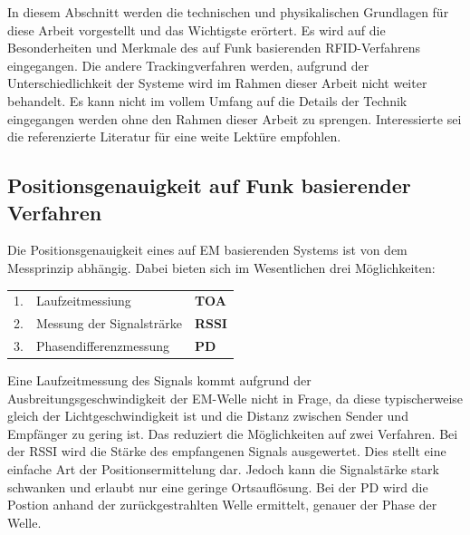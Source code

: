 In diesem Abschnitt werden die technischen und physikalischen Grundlagen für diese Arbeit vorgestellt und das Wichtigste erörtert. Es wird auf die Besonderheiten und Merkmale des auf Funk basierenden RFID-Verfahrens eingegangen. Die andere Trackingverfahren werden, aufgrund der Unterschiedlichkeit der Systeme wird im Rahmen dieser Arbeit nicht weiter behandelt. Es kann nicht im vollem Umfang auf die Details der Technik eingegangen werden ohne den Rahmen dieser Arbeit zu sprengen. Interessierte sei die referenzierte Literatur für eine weite Lektüre empfohlen.\\
%
%
\subsection{Positionsgenauigkeit auf Funk basierender Verfahren}
\label{sec:RFID_Accuracy}
Die Positionsgenauigkeit eines auf EM basierenden Systems ist von dem Messprinzip abhängig. Dabei bieten sich im Wesentlichen drei Möglichkeiten:\\
%
\begin{table} [ht!]
	\begin{center}
		\begin{tabular}{lp{65mm}p{15mm}}
		1. & Laufzeitmessiung & \textbf{TOA} \\
		2. & Messung der Signalsträrke & \textbf{RSSI} \\
		3. & Phasendifferenzmessung & \textbf{PD} \\
		\end{tabular}
	\end{center}
\end{table}
%
Eine Laufzeitmessung des Signals kommt aufgrund der Ausbreitungsgeschwindigkeit der EM-Welle nicht in Frage, da diese typischerweise gleich der Lichtgeschwindigkeit ist und die Distanz zwischen Sender und Empfänger zu gering ist. Das reduziert die Möglichkeiten auf zwei Verfahren.
Bei der RSSI wird die Stärke des empfangenen Signals ausgewertet. Dies stellt eine einfache Art der Positionsermittelung dar. Jedoch kann die Signalstärke stark schwanken und erlaubt nur eine geringe Ortsauflösung.
Bei der PD wird die Postion anhand der zurückgestrahlten Welle ermittelt, genauer der Phase der Welle.

